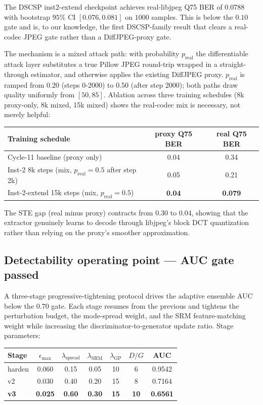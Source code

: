 The DSCSP inst2-extend checkpoint achieves real-libjpeg Q75 BER of
$0.0788$ with bootstrap $95\%$ CI $[0.076, 0.081]$ on $1000$ samples.
This is below the $0.10$ gate and is, to our knowledge, the first
DSCSP-family result that clears a real-codec JPEG gate rather than a
DiffJPEG-proxy gate.

The mechanism is a mixed attack path: with probability $p_{\mathrm{real}}$
the differentiable attack layer substitutes a true Pillow JPEG round-trip
wrapped in a straight-through estimator, and otherwise applies the
existing DiffJPEG proxy. $p_{\mathrm{real}}$ is ramped from $0.20$
(steps 0-2000) to $0.50$ (after step 2000); both paths draw quality
uniformly from $[50, 85]$. Ablation across three training schedules
(8k proxy-only, 8k mixed, 15k mixed) shows the real-codec mix is
necessary, not merely helpful:

\begin{center}
\begin{tabular}{lcc}
\toprule
Training schedule & proxy Q75 BER & real Q75 BER \\
\midrule
Cycle-11 baseline (proxy only)          & 0.04 & 0.34 \\
Inst-2 8k steps (mix, $p_{\mathrm{real}}{=}0.5$ after step 2k)   & 0.05 & 0.21 \\
Inst-2-extend 15k steps (mix, $p_{\mathrm{real}}{=}0.5$)          & \textbf{0.04} & \textbf{0.079} \\
\bottomrule
\end{tabular}
\end{center}

The STE gap (real minus proxy) contracts from $0.30$ to $0.04$, showing
that the extractor genuinely learns to decode through libjpeg's block
DCT quantization rather than relying on the proxy's smoother
approximation.

\subsection{Detectability operating point — AUC gate passed}

A three-stage progressive-tightening protocol drives the adaptive
ensemble AUC below the $0.70$ gate. Each stage resumes from the
previous and tightens the perturbation budget, the mode-spread weight,
and the SRM feature-matching weight while increasing the
discriminator-to-generator update ratio. Stage parameters:

\begin{center}
\begin{tabular}{lcccccc}
\toprule
Stage & $\epsilon_{\max}$ & $\lambda_{\mathrm{spread}}$ & $\lambda_{\mathrm{SRM}}$ & $\lambda_{\mathrm{GP}}$ & $D/G$ & AUC \\
\midrule
harden  & 0.060 & 0.15 & 0.05 & 10 & 6  & 0.9542 \\
v2      & 0.030 & 0.40 & 0.20 & 15 & 8  & 0.7164 \\
\textbf{v3} & \textbf{0.025} & \textbf{0.60} & \textbf{0.30} & \textbf{15} & \textbf{10} & \textbf{0.6561} \\
\bottomrule
\end{tabular}
\end{center}

